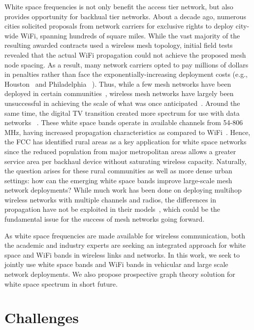 White space frequencies is not only benefit the access tier network, 
but also provides opportunity for backhual tier networks. About a 
decade ago, numerous cities solicited proposals from network carriers 
for exclusive rights to deploy city-wide WiFi, spanning hundreds of 
square miles. While the vast majority of the resulting awarded 
contracts used a wireless mesh topology, initial field tests revealed 
that the actual WiFi propagation could not achieve the proposed mesh node
spacing. As a result, many network carriers opted to pay millions of 
dollars in penalties rather than face the exponentially-increasing
deployment costs (e.g., Houston~\cite{cnet_aug07} and Philadelphia
~\cite{arstechnica_may08}). Thus, while a few mesh networks have been 
deployed in certain communities~\cite{CRSK06,google_imc08}, wireless 
mesh networks have largely been unsuccessful in achieving the scale 
of what was once anticipated~\cite{taps}. Around the same time, the 
digital TV transition created more spectrum for use with data networks
~\cite{fccwhitespace}. These white space bands operate in available 
channels from 54-806 MHz, having increased propagation characteristics 
as compared to WiFi~\cite{balanis2012antenna}. Hence, the FCC has 
identified rural areas as a key application for white space networks 
since the reduced population from major metropolitan areas allows a 
greater service area per backhaul device without saturating wireless 
capacity. Naturally, the question arises for these rural communities 
as well as more dense urban settings: how can the emerging white space 
bands improve large-scale mesh network deployments?  While much work 
has been done on deploying multihop wireless networks with multiple 
channels and radios, the differences in propagation have not be 
exploited in their models~\cite{raniwala2004centralized,tang2005interference, si2010overview}, 
which could be the fundamental issue for the success of mesh networks 
going forward.

As white space frequencies are made available for wireless communication,
both the academic and  industry experts are seeking an integrated approach
for white space and WiFi bands in wireless links and networks. 
In this work, we seek to jointly use 
white space bands and WiFi bands in vehicular and large scale network deployments. 
We also
propose prospective graph theory solution for white space spectrum 
in short future. 



\section{Challenges}

